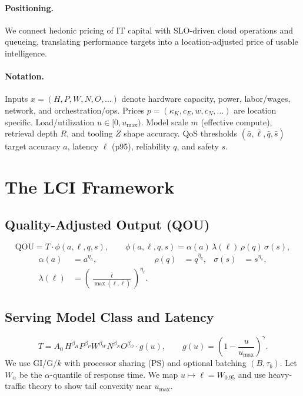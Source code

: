 ﻿\documentclass[12pt]{article}
\numberwithin{equation}{section}
\newcommand{\QOU}{\mathrm{QOU}}
\begin{document}
\paragraph{Positioning.} We connect hedonic pricing of IT capital \citep{Triplett1989,Pakes2003,Byrne2017} with SLO-driven cloud operations and queueing, translating performance targets into a location-adjusted price of usable intelligence.

\paragraph{Notation.} Inputs $x=(H,P,W,N,O,\dots)$ denote hardware capacity, power, labor/wages, network, and orchestration/ops. Prices $p=(\kappa_K,c_E,w,c_N,\dots)$ are location specific. Load/utilization $u\in[0,u_{\max})$. Model scale $m$ (effective compute), retrieval depth $R$, and tooling $Z$ shape accuracy. QoS thresholds $(\bar a,\bar \ell,\bar q,\bar s)$ target accuracy $a$, latency $\ell$ (p95), reliability $q$, and safety $s$.

\section{The LCI Framework}
\subsection{Quality-Adjusted Output (QOU)}
\begin{equation}
\QOU = T \cdot \phi(a,\ell,q,s),\qquad 
\phi(a,\ell,q,s)=\alpha(a)\,\lambda(\ell)\,\rho(q)\,\sigma(s),
\end{equation}
\vspace{-10pt}
\begin{align}
\alpha(a)&=a^{\eta_a}, &
\rho(q)&=q^{\eta_q}, &
\sigma(s)&=s^{\eta_s},\\
\lambda(\ell)&=\left(\frac{\bar\ell}{\max(\ell,\bar\ell)}\right)^{\eta_\ell}.
\end{align}

\subsection{Serving Model Class and Latency}
\begin{equation}
T = A_0\,H^{\beta_H} P^{\beta_P} W^{\beta_W} N^{\beta_N} O^{\beta_O}\cdot g(u),\qquad
g(u)=\left(1-\frac{u}{u_{\max}}\right)^{\gamma}.
\end{equation}
We use GI/G/$k$ with processor sharing (PS) and optional batching $(B,\tau_b)$. Let $W_\alpha$ be the $\alpha$-quantile of response time. We map $u\mapsto \ell=W_{0.95}$ and use heavy-traffic theory to show tail convexity near $u_{\max}$.
\end{document}
